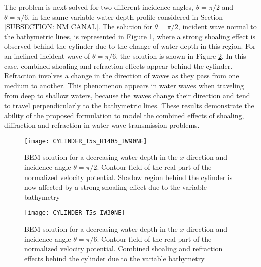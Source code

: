The problem is next solved for two different incidence angles, $\theta=\pi/2$ and $\theta=\pi/6$, in the same variable water-depth profile considered in Section \ref{SUBSECTION: NM CANAL}. The solution for $\theta=\pi/2$, incident wave normal to the bathymetric lines, is represented in Figure \ref{fig:Cylinder variable depth theta=90}, where a strong shoaling effect is observed behind the cylinder due to the change of water depth in this region. For an inclined incident wave of $\theta=\pi/6$, the solution is shown in Figure \ref{fig:Cylinder variable depth theta=30}. In this case, combined shoaling and refraction effects appear behind the cylinder. Refraction involves a change in the direction of waves as they pass from one medium to another. This phenomenon appears in water waves when traveling from deep to shallow waters, because the waves change their direction and tend to travel perpendicularly to the bathymetric lines. These results demonstrate the ability of the proposed formulation to model the combined effects of shoaling, diffraction and refraction in water wave transmission problems.

\begin{figure}
\begin{center}
\texttt{[image: CYLINDER\_T5s\_H1405\_IW90NE]}
\caption{BEM solution for a decreasing water depth in the $x$-direction and incidence angle $\theta=\pi/2$. Contour field of the real part of the normalized velocity potential. Shadow region behind the cylinder is now affected by a strong shoaling effect due to the variable bathymetry}
\label{fig:Cylinder variable depth theta=90}
\end{center}
\end{figure}

\begin{figure}
\begin{center}
\texttt{[image: CYLINDER\_T5s\_IW30NE]}
\caption{BEM solution for a decreasing water depth in the $x$-direction and incidence angle $\theta=\pi/6$. Contour field of the real part of the normalized velocity potential. Combined shoaling and refraction effects behind the cylinder due to the variable bathymetry}
\label{fig:Cylinder variable depth theta=30}
\end{center}
\end{figure}

